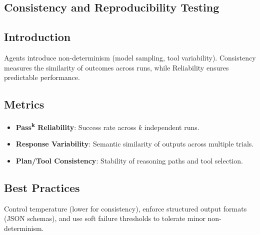 \begin{TNtwocol}
\section{Consistency and Reproducibility Testing }
\subsection{Introduction}
Agents introduce non-determinism (model sampling, tool variability). Consistency measures the similarity of outcomes across runs, while Reliability ensures predictable performance.

\subsection{Metrics}
\begin{itemize}
    \item \textbf{Pass\textsuperscript{k} Reliability}: Success rate across $k$ independent runs.
    \item \textbf{Response Variability}: Semantic similarity of outputs across multiple trials.
    \item \textbf{Plan/Tool Consistency}: Stability of reasoning paths and tool selection.
\end{itemize}

\subsection{Best Practices}
Control temperature (lower for consistency), enforce structured output formats (JSON schemas), and use soft failure thresholds to tolerate minor non-determinism.
\end{TNtwocol}
